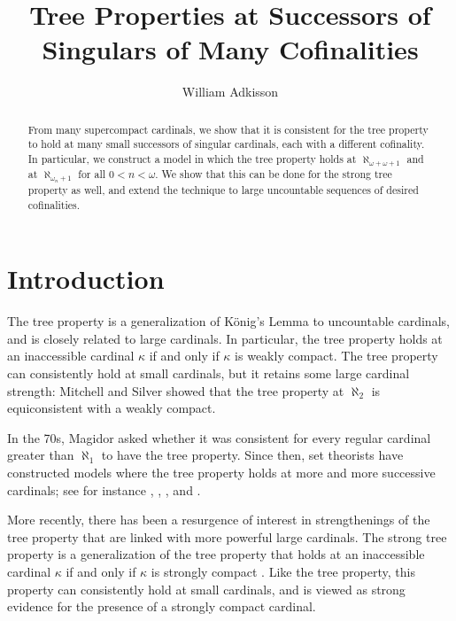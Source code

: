 \documentclass[psamsfonts]{amsart}
\title{Tree Properties at Successors of Singulars of Many Cofinalities}
\author{William Adkisson}
\theoremstyle{definition}
\newcommand{\ka}{\kappa}
\newcommand{\w}{\omega}
\numberwithin{equation}{section}
\begin{document}
\begin{abstract}
 From many supercompact cardinals, we show that it is consistent for the tree property to hold at many small successors of singular cardinals, each with a different cofinality. In particular, we construct a model in which the tree property holds at $\aleph_{\w+\w+1}$ and at $\aleph_{\w_n+1}$ for all $0<n<\w$. We show that this can be done for the strong tree property as well, and extend the technique to large uncountable sequences of desired cofinalities.
\end{abstract}

	\maketitle

\section{Introduction}

The tree property is a generalization of K\"onig's Lemma to uncountable cardinals, and is closely related to large cardinals. In particular, the tree property holds at an inaccessible cardinal $\ka$ if and only if $\ka$ is weakly compact. The tree property can consistently hold at small cardinals, but it retains some large cardinal strength: Mitchell and Silver \cite{mitchell:tp} showed that the tree property at $\aleph_2$ is equiconsistent with a weakly compact.

In the 70s, Magidor asked whether it was consistent for every regular cardinal greater than $\aleph_1$ to have the tree property. Since then, set theorists have constructed models where the tree property holds at more and more successive cardinals; see for instance \cite{abraham:treepropN2N3}, \cite{CF_TreeProp}, \cite{MS_TPSuccSing}, and \cite{NeemanTPNw+1}.

More recently, there has been a resurgence of interest in strengthenings of the tree property that are linked with more powerful large cardinals. The strong tree property is a generalization of the tree property that holds at an inaccessible cardinal $\ka$ if and only if $\ka$ is strongly compact \cite{jech:combinatorialprobs}. %
Like the tree property, %
this property can consistently hold at small cardinals, and is viewed as strong evidence for the presence of a strongly compact cardinal.
\end{document}
